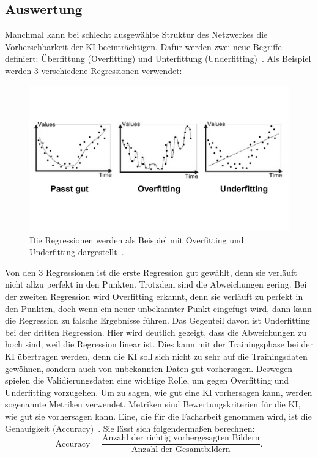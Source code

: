 \documentclass[11pt]{article}
\begin{document}
\subsection{Auswertung}\label{auswertung}
Manchmal kann bei schlecht ausgewählte Struktur des Netzwerkes die Vorhersehbarkeit der KI beeinträchtigen.
Dafür werden zwei neue Begriffe definiert: Überfittung (Overfitting) und Unterfittung (Underfitting)~\cite{7}.
Als Beispiel werden 3 verschiedene Regressionen verwendet:
\begin{figure}[h]
    \centering
    \includegraphics[width=330pt, keepaspectratio]{images/overfitting}
    \caption[Overfitting und Underfitting~\cite{7}]{Die Regressionen werden als Beispiel mit Overfitting und Underfitting dargestellt~\cite{7}.}
\end{figure}
Von den 3 Regressionen ist die erste Regression gut gewählt, denn sie verläuft nicht allzu perfekt in den Punkten. Trotzdem sind die
Abweichungen gering. Bei der zweiten Regression wird Overfitting erkannt, denn sie verläuft zu perfekt in den Punkten, doch wenn
ein neuer unbekannter Punkt eingefügt wird, dann kann die Regression zu falsche Ergebnisse führen. Das Gegenteil davon ist Underfitting
bei der dritten Regression. Hier wird deutlich gezeigt, dass die Abweichungen zu hoch sind, weil die Regression linear ist.
Dies kann mit der Trainingsphase bei der KI übertragen werden, denn die KI soll sich nicht zu sehr auf die Trainingsdaten gewöhnen,
sondern auch von unbekannten Daten gut vorhersagen. Deswegen spielen die Validierungsdaten eine wichtige Rolle, um gegen Overfitting
und Underfitting vorzugehen. Um zu sagen, wie gut eine KI vorhersagen kann, werden sogenannte Metriken verwendet. Metriken sind Bewertungskriterien für die KI,
wie gut sie vorhersagen kann. Eine, die für die Facharbeit genommen wird, ist die Genauigkeit (Accuracy)~\cite{21}. Sie lässt sich folgendermaßen
berechnen:
\begin{equation}
    \text{Accuracy} = \frac{\text{Anzahl der richtig vorhergesagten Bildern}}{\text{Anzahl der Gesamtbildern}}.
\end{equation}
\end{document}
